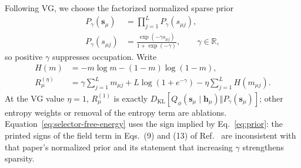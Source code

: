 \documentclass[aps,pre,reprint,superscriptaddress,amsmath,amssymb,nofootinbib]{revtex4-2}
\begin{document}
Following VG, we choose the factorized normalized sparse prior
\begin{align}
 P_\gamma(\bm s_\mu)
 &=\prod_{j=1}^{L}P_\gamma(s_{\mu j}),\nonumber\\
 P_\gamma(s_{\mu j})
 &=\frac{\exp(-\gamma s_{\mu j})}{1+\exp(-\gamma)},
 \qquad \gamma\in\mathbb R,
 \label{eq:prior}
\end{align}
so positive $\gamma$ suppresses occupation.  Write
\begin{align}
 H(m)&=-m\log m-(1-m)\log(1-m),\\
 R_\mu^{(\eta)}
 &=\gamma\sum_{j=1}^{L}m_{\mu j}
 +L\log(1+e^{-\gamma})
 -\eta\sum_{j=1}^{L}H(m_{\mu j}).
 \label{eq:selector-free-energy}
\end{align}
At the VG value $\eta=1$, $R_\mu^{(1)}$ is exactly
$D_{\mathrm{KL}}[Q_\phi(\bm s_\mu\mid\bm h_\mu)\Vert
P_\gamma(\bm s_\mu)]$; other entropy weights or removal of the entropy term
are ablations.  Equation~\eqref{eq:selector-free-energy}
uses the sign implied by Eq.~\eqref{eq:prior}: the printed signs of the field
term in Eqs.~(9) and (13) of Ref.~\cite{soh2025variational} are inconsistent
with that paper's normalized prior and its statement that increasing
$\gamma$ strengthens sparsity.
\end{document}
